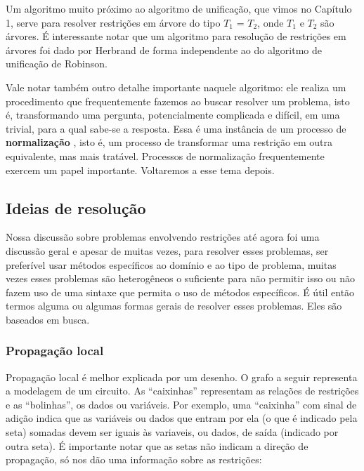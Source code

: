 \documentclass{article}
\theoremstyle{remark}
\theoremstyle{theorem}
\begin{document}
Um algoritmo muito próximo ao algoritmo de unificação, que vimos no Capítulo 1, serve para resolver restrições em árvore do tipo $T_1$ = $T_2$, onde $T_1$ e $T_2$ são árvores. É interessante notar que um algoritmo para resolução de restrições em árvores foi dado por Herbrand\cite{herbrand} de forma independente ao do algoritmo de unificação de Robinson.

Vale notar também outro detalhe importante naquele algoritmo: ele realiza um procedimento que frequentemente fazemos ao buscar resolver um problema, isto é, transformando uma pergunta, potencialmente complicada e difícil, em uma trivial, para a qual sabe-se a resposta. Essa é uma instância de um processo de \textbf{normalização} , isto é, um processo de transformar uma restrição em outra equivalente, mas mais tratável. Processos de normalização frequentemente
exercem um papel importante. Voltaremos a esse tema depois.

\subsection{Ideias de resolução}

Nossa discussão sobre problemas envolvendo restrições até agora foi uma discussão geral e apesar de muitas vezes, para resolver esses problemas, ser preferível usar métodos específicos ao domínio e ao tipo de problema, muitas vezes esses problemas são heterogêneos o suficiente para não permitir isso ou não fazem uso de uma sintaxe que permita o uso de métodos específicos.
É útil então termos alguma ou algumas formas gerais de resolver esses problemas. Eles são baseados em busca.

\subsubsection{Propagação local}

Propagação local é melhor explicada por um desenho. O grafo a seguir representa a modelagem de um circuito. %
As ``caixinhas'' representam as relações de restrições e as ``bolinhas'', os dados ou variáveis. Por exemplo, uma ``caixinha'' com sinal de adição indica que as variáveis ou dados que entram por ela (o que é indicado pela seta) somadas devem ser iguais às variaveis, ou dados, de saída (indicado por outra seta).
É importante notar que as setas não indicam a direção de propagação, só nos dão uma informação sobre as restrições:
\end{document}
